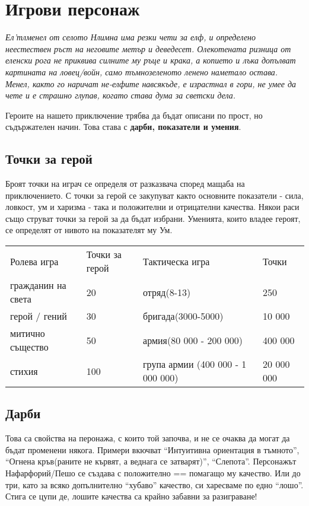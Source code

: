 
\section{Игрови персонаж}
\emph{Ел'тлменел от селото Нлимна има резки чети за елф, и определено неестествен ръст на неговите метър и деведесет.
Олекотената ризница от еленски рога не приквива силните му ръце и крака, а копието и лъка допълват картината на ловец/войн, само тъмнозеленото ленено наметало остава.
Менел, както го наричат не-елфите навсякъде, е израстнал в гори, не умее да чете и е страшно глупав, когато става дума за светски дела.}

Героите на нашето приключение трябва да бъдат описани по прост, но съдържателен начин.
Това става с \textbf{дарби, показатели и умения}.

\subsection{Точки за герой}
Броят точки на играч се определя от разказвача според мащаба на приключението.
С точки за герой се закупуват както основните показатели - сила, ловкост, ум и харизма - така и положителни и отрицателни качества.
Някои раси също струват точки за герой за да бъдат избрани.
Уменията, които владее героят, се определят от нивото на показателят му Ум.

\begin{tabular}{p{3cm} | p{2cm} | p{6cm} | p{3cm}}
Ролева игра          & Точки за герой      & Тактическа игра                   & Точки       \\
гражданин на света   & 20                  & отряд(8-13)                       & 250         \\
герой / гений        & 30                  & бригада(3000-5000)                & 10 000      \\
митично същество     & 50                  & армия(80 000 - 200 000)           & 400 000     \\
стихия               & 100                 & група армии (400 000 - 1 000 000) & 20 000 000  \\
\end{tabular}

\subsection{Дарби}
Това са свойства на перонажа, с които той започва, и не се очаква да могат да бъдат променени някога.
Примери вкючват “Интуитивна ориентация в тъмното”, “Огнена кръв(раните не кървят, а веднага се затварят)”, “Слепота”.
Персонажът Нафарфорий/Пешо се създава с { положително} == помагащо му качество.
Или до { три}, като за всяко допълнително “хубаво” качество, си харесваме по едно “лошо”. Стига се цупи де, лошите качества са крайно забавни за разиграване!

